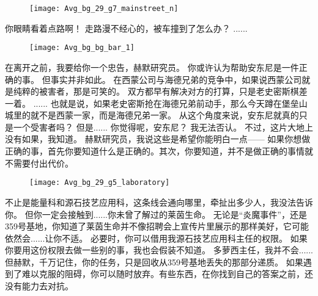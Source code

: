 \documentclass[openany]{book}
\begin{document}
\begin{figure}[h]
    \centering
    \texttt{[image: Avg\_bg\_29\_g7\_mainstreet\_n]}
\end{figure}
\begin{dialogue}
     你眼睛看着点路啊！
     走路漫不经心的，被车撞到了怎么办？
     ......
\end{dialogue}

\begin{figure}[h]
    \centering
    \texttt{[image: Avg\_bg\_bg\_bar\_1]}
\end{figure}
\begin{dialogue}
     在离开之前，我要给你一个忠告，赫默研究员。
     你或许认为帮助安东尼是一件正确的事。
     但事实并非如此。
     在西蒙公司与海德兄弟的竞争中，如果说西蒙公司就是纯粹的被害者，那是可笑的。
     双方都早有解决对方的打算，只是老史密斯棋差一着。
     ......
     也就是说，如果老史密斯抢在海德兄弟前动手，那么今天蹲在堡垒山城里的就不是西蒙一家，而是海德兄弟一家。
     从这个角度来说，安东尼就真的只是一个受害者吗？
     但是......
     你觉得呢，安东尼？
     我无法否认。
     不过，这片大地上没有如果，我知道。
     赫默研究员，我说这些是希望你能明白一点——
     如果你想做正确的事，首先你要知道什么是正确的。其次，你要知道，并不是做正确的事情就不需要付出代价。
\end{dialogue}

\begin{figure}[h]
    \centering
    \texttt{[image: Avg\_bg\_29\_g5\_laboratory]}
\end{figure}
\begin{dialogue}
     不止是能量科和源石技艺应用科，这条线会通向哪里，牵扯出多少人，我没法告诉你。
     但你一定会接触到......你未曾了解过的莱茵生命。
     无论是“炎魔事件”，还是359号基地，你知道了莱茵生命并不像招聘会上宣传片里展示的那样美好，它可能依然会......让你不适。
     必要时，你可以借用我源石技艺应用科主任的权限。
     如果你要用这份权限去做一些别的事，我也会假装不知道。
     多萝西主任，我并不会......
     但赫默，千万记住，你的任务，只是回收从359号基地丢失的那部分递质。
     如果遇到了难以克服的阻碍，你可以随时放弃。有些东西，在你找到自己的答案之前，还没有能力去对抗。
\end{dialogue}
\end{document}

